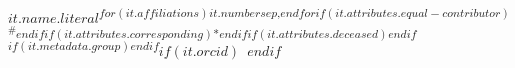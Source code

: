 $it.name.literal$\textsuperscript{$for(it.affiliations)$$it.number$$sep$,$endfor$$if(it.attributes.equal-contributor)$\textsuperscript{\#}$endif$$if(it.attributes.corresponding)$*$endif$$if(it.attributes.deceased)$\dag$endif$$if(it.metadata.group)$\textpilcrow$endif$}$if(it.orcid)$~$endif$